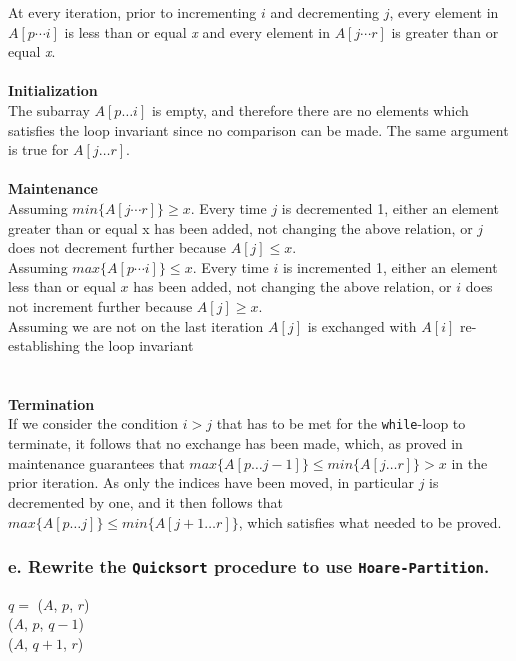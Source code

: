 \documentclass[11pt,english]{article}
\begin{document}
At every iteration, prior to incrementing $i$ and decrementing $j$, every 
element in $A[p \cdots i]$ is less than or equal \textit{x} and every 
element in $A[j \cdots r]$ is greater than or equal \textit{x}.
\\\\
\noindent \textbf{Initialization}\\
The subarray $A[p \dots i]$ is empty, and therefore there are no elements
which satisfies the loop invariant since no comparison can be made. The same
argument is true for $A[j \dots r]$.
\\\\
\noindent \textbf{Maintenance}\\
Assuming $min\{A[j \cdots r]\} \geq x$. Every time $j$ is decremented 1, 
either an element greater than or equal x has been added, not changing the 
above relation, or $j$ does not decrement further because $A[j] \leq x$. \\
Assuming $max\{A[p \cdots i]\} \leq x$. Every time $i$ is incremented 1, 
either an element less than or equal $x$ has been added, not changing the 
above relation, or $i$ does not increment further because $A[j] \geq x$. \\
Assuming we are not on the last iteration $A[j]$ is exchanged with $A[i]$ 
re-establishing the loop invariant\\
\\\\
\noindent \textbf{Termination}\\
If we consider the condition $i > j$ that has to be met for the
\texttt{while}-loop to terminate, it follows that no exchange has been made,
which, as proved in maintenance guarantees that
$max\{A[p \dots j-1]\} \leq min\{A[j \dots r]\} > x$ in the prior iteration.
As only the indices have been moved, in particular $j$ is decremented by one,
and it then follows that $max\{A[p \dots j]\} \leq min\{A[j+1 \dots r]\}$,
which satisfies what needed to be proved.

\subsubsection*{\large e. \mdseries Rewrite the \texttt{Quicksort} procedure
to use \texttt{Hoare-Partition}.}
\begin{algorithm}
	
	\BlankLine
	
	{
		$q =$ \Hoare($A$, $p$, $r$) \\
		\Quicksort($A$, $p$, $q - 1$) \\
		\Quicksort($A$, $q + 1$, $r$)
	}
\end{algorithm}
\end{document}
